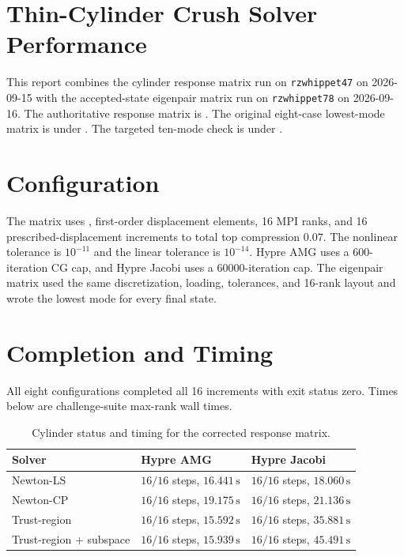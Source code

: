 \documentclass{article}
\begin{document}
\sloppy

\section*{Thin-Cylinder Crush Solver Performance}

This report combines the cylinder response matrix run on \texttt{rzwhippet47}
on 2026-09-15 with the accepted-state eigenpair matrix run on
\texttt{rzwhippet78} on 2026-09-16.  The authoritative response matrix is
.
The original eight-case lowest-mode matrix is under
.
The targeted ten-mode check is under
.

\section*{Configuration}

The matrix uses , first-order displacement elements,
16 MPI ranks, and 16 prescribed-displacement increments to total top compression
$0.07$.  The nonlinear tolerance is $10^{-11}$ and the linear tolerance is
$10^{-14}$.  Hypre AMG uses a 600-iteration CG cap, and Hypre Jacobi uses a
60000-iteration cap.  The eigenpair matrix used the same discretization, loading,
tolerances, and 16-rank layout and wrote the lowest mode for every final state.

\section*{Completion and Timing}

All eight configurations completed all 16 increments with exit status zero.  Times
below are challenge-suite max-rank wall times.

\begin{table}[h]
  \centering
  \small
  \caption{Cylinder status and timing for the corrected response matrix.}
  \begin{tabular}{@{}lll@{}}
    \toprule
    Solver & Hypre AMG & Hypre Jacobi \\
    \midrule
    Newton-LS & $16/16$ steps, $16.441\,\mathrm{s}$ & $16/16$ steps, $18.060\,\mathrm{s}$ \\
    Newton-CP & $16/16$ steps, $19.175\,\mathrm{s}$ & $16/16$ steps, $21.136\,\mathrm{s}$ \\
    Trust-region & $16/16$ steps, $15.592\,\mathrm{s}$ & $16/16$ steps, $35.881\,\mathrm{s}$ \\
    Trust-region + subspace & $16/16$ steps, $15.939\,\mathrm{s}$ & $16/16$ steps, $45.491\,\mathrm{s}$ \\
    \bottomrule
  \end{tabular}
\end{table}
\end{document}
